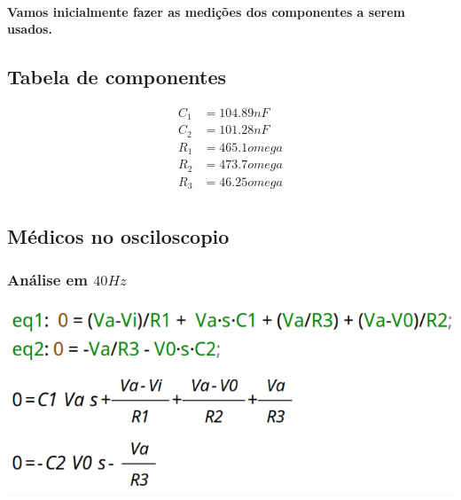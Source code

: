 \documentclass[12pt,twoside, a4paper, twocolumn]{article}
\begin{document}
\paragraph{Vamos inicialmente fazer as medições dos componentes a serem usados.}




\subsection{Tabela de componentes}




\begin{equation*}
    \begin{aligned}
        C_1 & = 104.89nF    \\
        C_2 & = 101.28nF    \\
        R_1 & = 465.1 omega \\
        R_2 & = 473.7 omega \\
        R_3 & = 46.25 omega \\
    \end{aligned}
\end{equation*}




\subsection{Médicos no osciloscopio}




\subsubsection*{Análise em $40Hz$}
\subparagraph*{}




\begin{adjustbox}{scale=0.18}
    \includegraphics{eqs.png}
\end{adjustbox}
\end{document}
